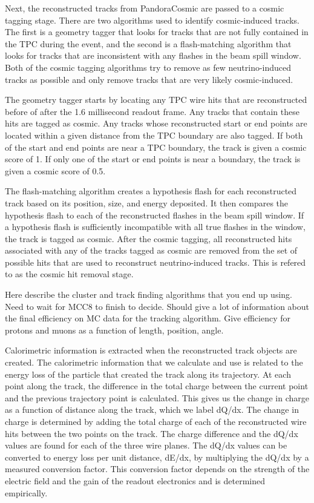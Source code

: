     Next, the reconstructed tracks from PandoraCosmic are passed to a cosmic
    tagging stage. There are two algorithms used to identify cosmic-induced
    tracks. The first is a geometry tagger that looks for tracks that are not
    fully contained in the TPC during the event, and the second is a
    flash-matching algorithm that looks for tracks that are inconsistent with
    any flashes in the beam spill window. Both of the cosmic tagging algorithms
    try to remove as few neutrino-induced tracks as possible and only remove
    tracks that are very likely cosmic-induced.
    
    The geometry tagger starts by locating any TPC wire hits that are
    reconstructed before of after the 1.6 millisecond readout frame. Any tracks
    that contain these hits are tagged as cosmic. Any tracks whose
    reconstructed start or end points are located within a given distance from
    the TPC boundary are also tagged. If both of the start and end points are
    near a TPC boundary, the track is given a cosmic score of 1. If only one of
    the start or end points is near a boundary, the track is given a cosmic
    score of 0.5.
    
    The flash-matching algorithm creates a hypothesis flash for each
    reconstructed track based on its position, size, and energy deposited. It
    then compares the hypothesis flash to each of the reconstructed flashes in
    the beam spill window. If a hypothesis flash is sufficiently incompatible
    with all true flashes in the window, the track is tagged as cosmic. After
    the cosmic tagging, all reconstructed hits associated with any of the
    tracks tagged as cosmic are removed from the set of possible hits that are
    used to reconstruct neutrino-induced tracks. This is refered to as the
    cosmic hit removal stage.

    Here describe the cluster and track finding algorithms that you end up
    using. Need to wait for MCC8 to finish to decide. Should give a lot of
    information about the final efficiency on MC data for the tracking
    algorithm. Give efficiency for protons and muons as a function of length,
    position, angle.

    Calorimetric information is extracted when the reconstructed track objects
    are created. The calorimetric information that we calculate and use is
    related to the energy loss of the particle that created the track along its
    trajectory. At each point along the track, the difference in the total
    charge between the current point and the previous trajectory point is
    calculated. This gives us the change in charge as a function of distance
    along the track, which we label dQ/dx. The change in charge is determined
    by adding the total charge of each of the reconstructed wire hits between
    the two points on the track. The charge difference and the dQ/dx values are
    found for each of the three wire planes. The dQ/dx values can be converted
    to energy loss per unit distance, dE/dx, by multiplying the dQ/dx by a
    measured conversion factor. This conversion factor depends on the strength
    of the electric field and the gain of the readout electronics and is
    determined empirically.

